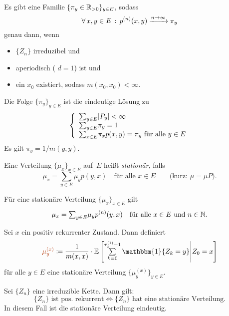 \documentclass{cheat-sheet}
\newcommand{\E}{\mathbb{E}} %
\newcommand{\ind}{\mathbbm{1}} %
\newcommand{\Defn}[1]{\textcolor{DefinitionColor}{#1}}
\begin{document}
\begin{satz}
  Es gibt eine Familie $\{ \pi_y \in \mathbb{R}_{> 0} \}_{y \in E}$, sodass
  \[ \forall \, {x, y \in E} \,:\, p^{(n)}(x, y) \xrightarrow{n \to \infty} \pi_y \]
  genau dann, wenn
  \begin{itemize}
    \item $\{ Z_n \}$ irreduzibel und
    \item aperiodisch (\dh{} $d = 1$) ist und
    \item ein $x_0$ existiert, sodass $m(x_0, x_0) < \infty$.
  \end{itemize}
  Die Folge $\{ \pi_y \}_{y \in E}$ ist die eindeutige Lösung zu
  \[
    \left\{
      \begin{array}{l}
        {\sum}_{y \in E} \abs{P_y} < \infty \\
        {\sum}_{y \in E} \pi_y = 1 \\
        {\sum}_{x \in E} \pi_x p(x, y) = \pi_y \text{ für alle } y \in E
      \end{array}
    \right.
  \]
  Es gilt $\pi_y = 1/m(y,y)$.
\end{satz}



\begin{defn}
  Eine Verteilung $\{ \mu_x \}_{x \in E}$ auf~$E$ heißt \emph{stationär}, falls
  \[
    \mu_x = {\sum}_{y \in E} \mu_y p(y, x)
    \quad \text{für alle $x \in E$}
    \qquad \text{(kurz: $\mu = \mu P$).}
  \]
\end{defn}

\begin{bem}
  Für eine stationäre Verteilung $\{ \mu_x \}_{x \in E}$ gilt
  \[
    \mu_x = {\sum}_{y \in E} \mu_y p^{(n)}(y, x)
    \quad \text{für alle $x \in E$ und $n \in \N$.}
  \]
\end{bem}

\begin{lem}
  Sei $x$ ein positiv rekurrenter Zustand.
  Dann definiert
  \[
    \Defn{\mu_y^{(x)}} \coloneqq \frac{1}{m(x, x)} \cdot \E \left[ \sum_{k=0}^{\tau_x^{(1)} - 1} \ind \{ Z_k = y \} \middle| Z_0 = x \right]
  \]
  für alle $y \in E$ eine stationäre Verteilung $\{ \mu_y^{(x)} \}_{y \in E}$.
\end{lem}

\begin{satz}
  Sei $\{ Z_n \}$ eine irreduzible Kette.
  Dann gilt:
  \[
    \{ Z_n \} \text{ ist pos. rekurrent} \iff
    \{ Z_n \} \text{ hat eine stationäre Verteilung.}
  \]
  In diesem Fall ist die stationäre Verteilung eindeutig.
\end{satz}
\end{document}
